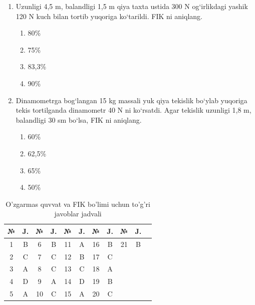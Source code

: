 \begin{enumerate}
\item Uzunligi 4,5 m, balandligi 1,5 m qiya taxta ustida 300 N og‘irlikdagi yashik 120 N kuch bilan tortib yuqoriga ko‘tarildi. FIK ni aniqlang.
\begin{enumerate}[label=\Alph*)]
\item 80\%
\item 75\%
\item 83,3\%
\item 90\%
\end{enumerate}

\item Dinamometrga bog‘langan 15 kg massali yuk qiya tekislik bo‘ylab yuqoriga tekis tortilganda dinamometr 40 N ni ko‘rsatdi. Agar tekislik uzunligi 1,8 m, balandligi 30 sm bo‘lsa, FIK ni aniqlang.
\begin{enumerate}[label=\Alph*)]
\item 60\%
\item 62,5\%
\item 65\%
\item 50\%
\end{enumerate}

\end{enumerate}




\begin{table}[h!]
\centering
\caption{O'zgarmas quvvat va FIK bo'limi uchun to'g'ri javoblar jadvali}
\begin{tabular}{|c|c|c|c|c|c|c|c|c|c|c|}
\hline
№ & J. & № & J. & № & J. & № & J. & № & J. \\ \hline
1 & B & 6 & B & 11 & A & 16 & B & 21 & B \\ \hline
2 & C & 7 & C & 12 & B & 17 & C & & \\ \hline
3 & A & 8 & C & 13 & C & 18 & A & & \\ \hline
4 & D & 9 & A & 14 & D & 19 & B & & \\ \hline
5 & A & 10 & C & 15 & A & 20 & C & & \\ \hline
\end{tabular}
\end{table}